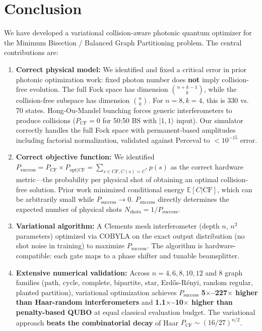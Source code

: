 \section{Conclusion}
\label{sec:conclusion}

We have developed a variational collision-aware photonic quantum optimizer for the Minimum Bisection / Balanced Graph Partitioning problem. The central contributions are:

\begin{enumerate}
\item \textbf{Correct physical model:} We identified and fixed a critical error in prior photonic optimization work: fixed photon number does \textbf{not} imply collision-free evolution. The full Fock space has dimension $\binom{n+k-1}{k}$, while the collision-free subspace has dimension $\binom{n}{k}$. For $n=8, k=4$, this is 330 vs. 70 states. Hong-Ou-Mandel bunching forces generic interferometers to produce collisions ($P_{\mathrm{CF}}=0$ for 50:50 BS with $|1,1\rangle$ input). Our simulator correctly handles the full Fock space with permanent-based amplitudes including factorial normalization, validated against Perceval to $< 10^{-15}$ error.

\item \textbf{Correct objective function:} We identified $P_{\mathrm{success}} = P_{\mathrm{CF}} \times P_{\mathrm{opt|CF}} = \sum_{s\in\mathrm{CF}, C(s)=C^*} p(s)$ as the correct hardware metric---the probability per physical shot of obtaining an optimal collision-free solution. Prior work minimized conditional energy $\mathbb{E}[C|\mathrm{CF}]$, which can be arbitrarily small while $P_{\mathrm{success}}\to 0$. $P_{\mathrm{success}}$ directly determines the expected number of physical shots $N_{\mathrm{shots}} = 1/P_{\mathrm{success}}$.

\item \textbf{Variational algorithm:} A Clements mesh interferometer (depth $n$, $n^2$ parameters) optimized via COBYLA on the exact output distribution (no shot noise in training) to maximize $P_{\mathrm{success}}$. The algorithm is hardware-compatible: each gate maps to a phase shifter and tunable beamsplitter.

\item \textbf{Extensive numerical validation:} Across $n=4,6,8,10,12$ and 8 graph families (path, cycle, complete, bipartite, star, Erd\H{o}s-R\'enyi, random regular, planted partition), variational optimization achieves $P_{\mathrm{success}}$ \textbf{5$\times$--227$\times$ higher than Haar-random interferometers} and \textbf{1.1$\times$--10$\times$ higher than penalty-based QUBO} at equal classical evaluation budget. The variational approach \textbf{beats the combinatorial decay} of Haar $P_{\mathrm{CF}} \sim (16/27)^{n/2}$.


\end{enumerate}
